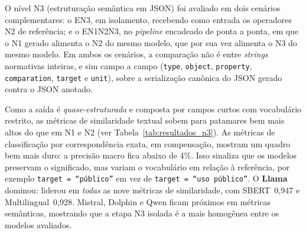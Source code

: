 \documentclass[a4paper,fleqn]{cas-sc}
\begin{document}
O nível N3 (estruturação semântica em JSON) foi avaliado em dois cenários complementares: o EN3, em isolamento, recebendo como entrada os operadores N2 de referência; e o EN1N2N3, no \textit{pipeline} encadeado de ponta a ponta, em que o N1 gerado alimenta o N2 do mesmo modelo, que por sua vez alimenta o N3 do mesmo modelo. Em ambos os cenários, a comparação não é entre \textit{strings} normativas inteiras, e sim campo a campo (\texttt{type}, \texttt{object}, \texttt{property}, \texttt{comparation}, \texttt{target} e \texttt{unit}), sobre a serialização canônica do JSON gerado contra o JSON anotado.

Como a saída é \textit{quase-estruturada} e composta por campos curtos com vocabulário restrito, as métricas de similaridade textual sobem para patamares bem mais altos do que em N1 e N2 (ver Tabela~\ref{tab:resultados_n3}). As métricas de classificação por correspondência exata, em compensação, mostram um quadro bem mais duro: a precisão macro fica abaixo de 4\%. Isso sinaliza que os modelos preservam o significado, mas variam o vocabulário em relação à referência, por exemplo \texttt{target = ``público''} em vez de \texttt{target = ``uso público''}. O \textbf{Llama} dominou: liderou em \textit{todas} as nove métricas de similaridade, com SBERT~0{,}947 e Multilingual~0{,}928. Mistral, Dolphin e Qwen ficam próximos em métricas semânticas, mostrando que a etapa N3 isolada é a mais homogênea entre os modelos avaliados.
\end{document}
